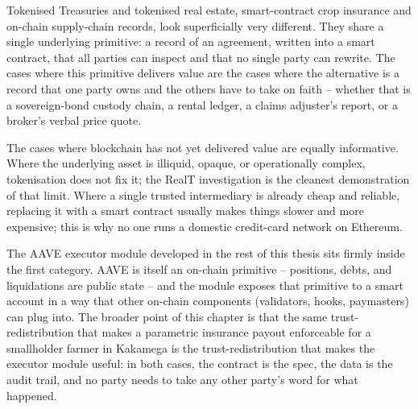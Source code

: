 Tokenised Treasuries and tokenised real estate, smart-contract crop
insurance and on-chain supply-chain records, look superficially very
different. They share a single underlying primitive: a record of an
agreement, written into a smart contract, that all parties can inspect and
that no single party can rewrite. The cases where this primitive delivers
value are the cases where the alternative is a record that one party owns
and the others have to take on faith -- whether that is a sovereign-bond
custody chain, a rental ledger, a claims adjuster's report, or a broker's
verbal price quote.

The cases where blockchain has not yet delivered value are equally
informative. Where the underlying asset is illiquid, opaque, or
operationally complex, tokenisation does not fix it; the RealT
investigation is the cleanest demonstration of that limit. Where a single
trusted intermediary is already cheap and reliable, replacing it with a
smart contract usually makes things slower and more expensive; this is why
no one runs a domestic credit-card network on Ethereum.

The AAVE executor module developed in the rest of this thesis sits firmly
inside the first category. AAVE is itself an on-chain primitive --
positions, debts, and liquidations are public state -- and the module
exposes that primitive to a smart account in a way that other on-chain
components (validators, hooks, paymasters) can plug into. The broader
point of this chapter is that the same trust-redistribution that makes a
parametric insurance payout enforceable for a smallholder farmer in
Kakamega is the trust-redistribution that makes the executor module
useful: in both cases, the contract is the spec, the data is the audit
trail, and no party needs to take any other party's word for what
happened.
